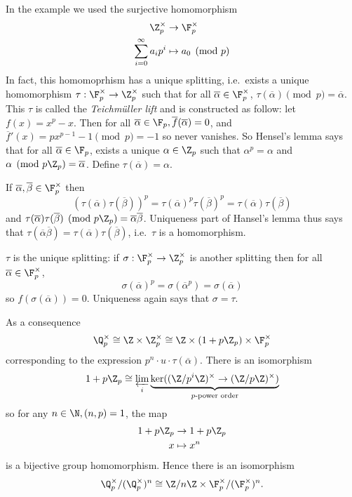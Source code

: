 \documentclass[a4paper]{article}
\begin{document}
In the example we used the surjective homomorphism
\begin{align*}
  \Z_p^\times &\to \F_p^\times \\
  \sum_{i = 0}^\infty a_i p^i &\mapsto a_0 \pmod p
\end{align*}
In fact, this homomoprhism has a unique splitting, i.e.\ exists a unique homomorphism \(\tau: \F_p^\times \to \Z_p^\times\) such that for all \(\overline \alpha \in \F_p^\times\), \(\tau(\overline \alpha) \pmod p = \overline \alpha\). This \(\tau\) is called the \emph{Teichmüller lift} and is constructed as follow: let \(f(x) = x^p - x\). Then for all \(\overline \alpha \in \F_p, \overline f(\overline \alpha) = 0\), and \(\overline f'(x) = px^{p - 1} - 1 \pmod p = -1\) so never vanishes. So Hensel's lemma says that for all \(\overline \alpha \in \F_p\), exists a unique \(\alpha \in \Z_p\) such that \(\alpha^p = \alpha\) and \(\alpha \pmod{p\Z_p} = \overline \alpha\). Define \(\tau(\overline \alpha) = \alpha\).

If \(\overline \alpha, \overline \beta \in \F_p^\times\) then
\[
  (\tau(\overline \alpha) \tau(\overline \beta))^p
  = \tau(\overline \alpha)^p \tau(\overline \beta)^p
  = \tau(\overline \alpha) \tau(\overline \beta)
\]
and \(\tau(\overline \alpha) \tau(\overline \beta) \pmod{p\Z_p} = \overline \alpha \overline \beta\). Uniqueness part of Hansel's lemma thus says that \(\tau(\overline \alpha \overline \beta) = \tau(\overline \alpha) \tau(\overline \beta)\), i.e.\ \(\tau\) is a homomorphism.

\(\tau\) is the unique splitting: if \(\sigma: \F_p^\times \to \Z_p^\times\) is another splitting then for all \(\overline \alpha \in \F_p^\times\),
\[
  \sigma(\overline \alpha)^p = \sigma(\overline \alpha^p) = \sigma(\overline \alpha)
\]
so \(f(\sigma(\overline \alpha)) = 0\). Uniqueness again says that \(\sigma = \tau\).

As a consequence
\[
  \Q_p^\times \cong \Z \times \Z_p^\times \cong \Z \times (1 + p \Z_p) \times \F_p^\times
\]
corresponding to the expression \(p^n \cdot u \cdot \tau(\overline \alpha)\). There is an isomorphism
\[
  1 + p \Z_p \cong \varprojlim_i \underbrace{\ker ((\Z/p^i\Z)^\times \to (\Z/p\Z)^\times)}_{\text{\(p\)-power order}}
\]
so for any \(n \in \N, (n, p) = 1\), the map
\begin{align*}
  1 + p \Z_p &\to 1 + p\Z_p \\
  x &\mapsto x^n
\end{align*}
is a bijective group homomorphism. Hence there is an isomorphism
\[
  \Q_p^\times /(\Q_p^\times)^n \cong \Z/n\Z \times \F_p^\times/(\F_p^\times)^n.
\]
\end{document}
